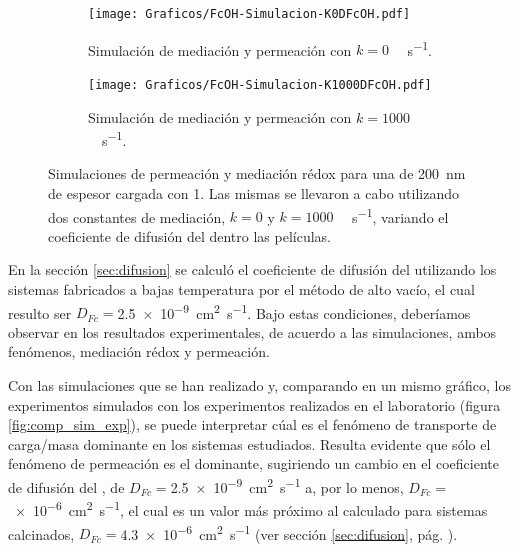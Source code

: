 				\begin{figure}[h!]
				\begin{subfigure}[t]{0.495\textwidth}
					\centering
			 	    \texttt{[image: Graficos/FcOH-Simulacion-K0DFcOH.pdf]}
			        \vspace*{-4mm}
			        \caption{Simulación de mediación y permeación con $k=0$ \si{\per\Molar\per\second}.}
			        \label{fig:sim_med_k0}
			      	\end{subfigure}
				\begin{subfigure}[t]{0.495\textwidth}
					\centering
			 	    \texttt{[image: Graficos/FcOH-Simulacion-K1000DFcOH.pdf]}
			        \vspace*{-4mm}
			        \caption{Simulación de mediación y permeación con $k=1000$ \si{\per\Molar\per\second}.}
			        \label{fig:sim_med_1000}
			      	\end{subfigure}
			      	\vspace*{-1mm}
			      	\caption[Simulación EQ de mediación/permeación]{Simulaciones de permeación y mediación rédox para una \pdm\space de \SI{200}{nm} de espesor cargada con \ru\space \SI{1}{\Molar}. Las mismas se llevaron a cabo utilizando dos constantes de mediación, $k=0$ y $k=1000$ \si{\per\Molar\per\second}, variando el coeficiente de difusión del \fc\space dentro las películas.}
			      	\label{fig:sim_med_perm}
			      	\end{figure}
			  	

		En la sección \ref{sec:difusion} se calculó el coeficiente de difusión del \fc\space utilizando los sistemas fabricados a bajas temperatura por el método de alto vacío, el cual resulto ser $D_{Fc}\!\!=$\SI{2.5e-9}{\square\cm\per\second}. Bajo estas condiciones, deberíamos observar en los resultados experimentales, de acuerdo a las simulaciones, ambos fenómenos, mediación rédox y permeación. 
						
		
	   	Con las simulaciones que se han realizado y, comparando en un mismo gráfico, los experimentos simulados con los experimentos realizados en el laboratorio (figura \ref{fig:comp_sim_exp}), se puede interpretar cúal es el fenómeno de transporte de carga/masa dominante en los sistemas estudiados. Resulta evidente que sólo el fenómeno de permeación es el dominante, sugiriendo un cambio en el coeficiente de difusión del \fc, de $D_{Fc}\!=$\SI{2.5e-9}{\square\cm\per\second} a, por lo menos, $D_{Fc}\!=$\SI{e-6}{\square\cm\per\second}, el cual es un valor más próximo al calculado para sistemas calcinados, $D_{Fc}\!=$\SI{4.3e-6}{\square\cm\per\second} (ver sección \ref{sec:difusion}, pág. \pageref{sec:difusion}). 


